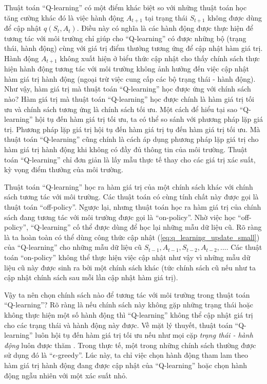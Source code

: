 Thuật toán ``Q-learning'' có một điểm khác biệt so với những thuật toán học tăng cường khác đó là việc hành động $A_{t+1}$ tại trạng thái $S_{t+1}$ không được dùng để cập nhật $q(S_t, A_t)$.
Điều này có nghĩa là các hành động được thực hiện để tương tác với môi trường chỉ giúp cho ``Q-learning'' có được những bộ (trạng thái, hành động) cùng với giá trị điểm thưởng tương ứng để cập nhật hàm giá trị.
Hành động $A_{t+1}$ không xuất hiện ở biểu thức cập nhật cho thấy chính sách thực hiện hành động tương tác với môi trường không ảnh hưởng đến việc cập nhật hàm giá trị hành động (ngoại trừ việc cung cấp các bộ trạng thái - hành động).
Như vậy, hàm giá trị mà thuật toán ``Q-learning'' học được ứng với chính sách nào?
Hàm giá trị mà thuật toán ``Q-learning'' học được chính là hàm giá trị tối ưu và chính sách tương ứng là chính sách tối ưu.
Một cách để hiểu tại sao ``Q-learning'' hội tụ đến hàm giá trị tối ưu, ta có thể so sánh với phương pháp lặp giá trị.
Phương pháp lặp giá trị hội tụ đến hàm giá trị tụ đến hàm giá trị tối ưu.
Mà thuật toán ``Q-learning'' cũng chính là cách áp dụng phương pháp lặp giá trị cho hàm giá trị hành động khi không có đầy đủ thông tin của môi trường.
Thuật toán ``Q-learning'' chỉ đơn giản là lấy mẫu thực tế thay cho các giá trị xác suất, kỳ vọng điểm thưởng của môi trường.

Thuật toán ``Q-learning'' học ra hàm giá trị của một chính sách khác với chính sách tương tác với môi trường.
Các thuật toán có cùng tính chất này được gọi là thuật toán ``off-policy''.
Ngược lại, nhưng thuật toán học ra hàm giá trị của chính sách đang tương tác với môi trường được gọi là ``on-policy''.
Nhờ việc học ``off-policy'', ``Q-learning'' cố thể được dùng để học lại những mẫu dữ liệu cũ.
Rõ ràng là ta hoàn toàn có thể dùng công thức cập nhật (\ref{eq:q_learning_update_small}) của ``Q-learning'' cho những mẫu dữ liệu cũ $S_{t-1}, A_{t-1}, S_{t-2}, A_{t-2}, ...$.
Các thuật toán ``on-policy'' không thể thực hiện việc cập nhật như vậy vì những mẫu dữ liệu cũ này được sinh ra bởi một chính sách khác (tức chính sách cũ nếu như ta cập nhật chính sách sau mỗi lần cập nhật hàm giá trị).

Vậy ta nên chọn chính sách nào để tương tác với môi trường trong thuật toán ``Q-learning''?
Rõ ràng là nếu chính sách này không gặp những trạng thái hoặc không thực hiện một số hành động thì ``Q-learning'' không thể cập nhật giá trị cho các trạng thái và hành động này được.
Về mặt lý thuyết, thuật toán ``Q-learning'' luôn hội tụ đến hàm giá trị tối ưu nếu như mọi cặp \textit{trạng thái - hành động} luôn được thăm \cite{sutton1998introduction}.
Trong thực tế, một trong những chính sách thường được sử dụng đó là ``$\epsilon$-greedy''.
Lúc này, ta chỉ việc chọn hành động tham lam theo hàm giá trị hành động đang được cập nhật của ``Q-learning'' hoặc chọn hành động ngẫu nhiên với một xác suất nhỏ.

